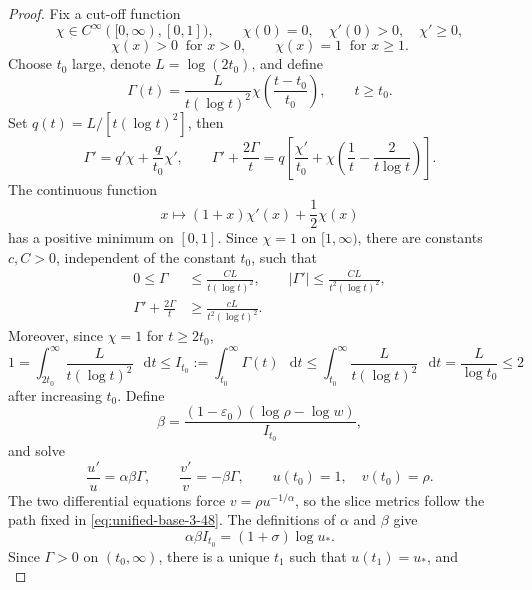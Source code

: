 \documentclass[11pt,reqno]{amsart}
\theoremstyle{definition}
\numberwithin{equation}{section}
\newcommand{\dd}{\mathop{}\!\mathrm d}
\begin{document}
\begin{proof}
Fix a cut-off function
\[
 \chi\in C^\infty([0,\infty),[0,1]),\qquad
 \chi(0)=0,\quad \chi'(0)>0,\quad \chi'\geq0,
\]
\[
 \chi(x)>0\ \text{ for } x>0,\qquad \chi(x)=1\ \text{ for } x\geq1.
\]
Choose \(t_0\) large, denote \(L=\log(2t_0)\), and define
\begin{equation}
\Gamma(t)=\frac{L}{t(\log t)^2}
 \chi\!\left(\frac{t-t_0}{t_0}\right),
 \qquad t\geq t_0.                                                \label{eq:unified-base-3-50}
\end{equation}
Set \(q(t)=L/[t(\log t)^2]\), then
\[
 \Gamma'=q'\chi+\frac q{t_0}\chi',\qquad
 \Gamma'+\frac{2\Gamma}{t}
 =q\left[
 \frac{\chi'}{t_0}
 +\chi\left(\frac1t-\frac2{t\log t}\right)\right].
\]
The continuous function
\[
 x\longmapsto (1+x)\chi'(x)+\frac12\chi(x)
\]
has a positive minimum on \([0,1]\).  Since \(\chi=1\) on
\([1,\infty)\), there are constants \(c,C>0\), independent of the constant
\(t_0\), such that
\begin{align}
 0\le\Gamma&\le\frac{CL}{t(\log t)^2}, \qquad
 |\Gamma'|\le\frac{CL}{t^2(\log t)^2},                           \label{eq:unified-base-3-51}\\
\Gamma'+\frac{2\Gamma}{t}
 &\ge\frac{cL}{t^2(\log t)^2}.                                   \label{eq:unified-base-3-52}
\end{align}
Moreover, since \(\chi=1\) for \(t\geq2t_0\),
\begin{equation}\label{eq:I t0 bound}
 1=\int_{2t_0}^{\infty}\frac{L}{t(\log t)^2}\,\dd t
 \leq I_{t_0}:=\int_{t_0}^{\infty}\Gamma(t)\,\dd t
 \leq\int_{t_0}^{\infty}\frac{L}{t(\log t)^2}\,\dd t
 =\frac{L}{\log t_0}\leq2
\end{equation}
after increasing \(t_0\).
Define
\begin{equation}
\beta=\frac{(1-\varepsilon_0)(\log\rho-\log w)}
              {I_{t_0}},                                         \label{eq:unified-base-3-53}
\end{equation}
and solve
\begin{equation}
\frac{u'}u=\alpha\beta\Gamma,\qquad
 \frac{v'}v=-\beta\Gamma,\qquad u(t_0)=1,\quad v(t_0)=\rho.    \label{eq:unified-base-3-54}
\end{equation}
The two differential equations force $v=\rho u^{-1/\alpha}$, so the
slice metrics follow the path fixed in \eqref{eq:unified-base-3-48}.
The definitions of \(\alpha\) and \(\beta\) give
\[
 \alpha\beta I_{t_0}=(1+\sigma)\log u_*.
\]
Since \(\Gamma>0\) on \((t_0,\infty)\), there is a unique \(t_1\)
such that \(u(t_1)=u_*\), and
\begin{equation}\label{eq:I t0 identity}

\end{equation}
\end{proof}
\end{document}

